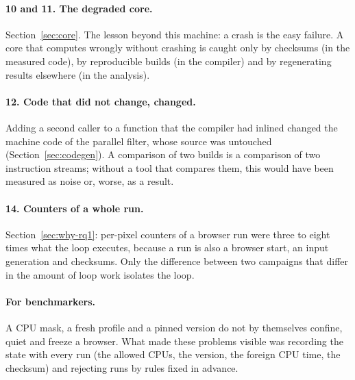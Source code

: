 \paragraph{10 and 11. The degraded core.} Section~\ref{sec:core}. The lesson
beyond this machine: a crash is the easy failure. A core that computes
wrongly without crashing is caught only by checksums (in the measured
code), by reproducible builds (in the compiler) and by regenerating results
elsewhere (in the analysis).

\paragraph{12. Code that did not change, changed.} Adding a second caller
to a function that the compiler had inlined changed the machine code of the
parallel filter, whose source was untouched (Section~\ref{sec:codegen}). A
comparison of two builds is a comparison of two instruction streams;
without a tool that compares them, this would have been measured as noise
or, worse, as a result.

\paragraph{14. Counters of a whole run.} Section~\ref{sec:why-rq1}: per-pixel
counters of a browser run were three to eight times what the loop executes,
because a run is also a browser start, an input generation and checksums.
Only the difference between two campaigns that differ in the amount of loop
work isolates the loop.

\paragraph{For benchmarkers.} A CPU mask, a fresh profile and a pinned
version do not by themselves confine, quiet and freeze a browser. What made
these problems visible was recording the state with every run (the allowed
CPUs, the version, the foreign CPU time, the checksum) and rejecting runs
by rules fixed in advance.
